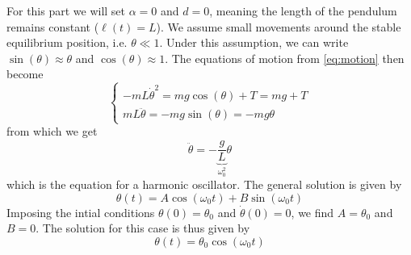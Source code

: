 For this part we will set \(\alpha=0\) and \(d=0\), meaning the length of the pendulum remains constant (\(\ell(t)=L\)). We assume small movements around the stable equilibrium position, i.e. \(\theta \ll 1\). Under this assumption, we can write \(\sin(\theta) \approx \theta\) and \(\cos(\theta) \approx 1\). The equations of motion from \autoref{eq:motion} then become
\begin{equation}
    \begin{cases}
        -m L \dot\theta^2 = mg\cos(\theta) + T = mg + T \\
        m L \ddot\theta = -mg\sin(\theta) = -mg\theta
    \end{cases}
\end{equation}
from which we get
\begin{equation}
    \ddot\theta = - \underbrace{\frac{g}{L}}_{\omega_0^2} \theta
\end{equation}
which is the equation for a harmonic oscillator. The general solution is given by
\begin{equation}
    \theta(t) = A\cos(\omega_0 t) + B\sin(\omega_0 t)
\end{equation}
Imposing the intial conditions \(\theta(0) = \theta_0\) and \(\dot\theta(0) = 0\), we find \(A = \theta_0\) and \(B = 0\). The solution for this case is thus given by
\begin{equation}
    \theta(t) = \theta_0 \cos(\omega_0 t)
\end{equation}
